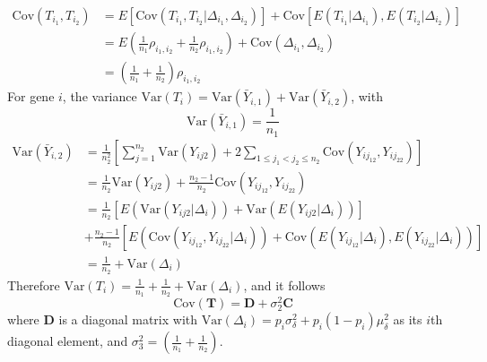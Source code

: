 \documentclass[11pt, a4paper]{article}
\begin{document}
				\begin{equation}
					\begin{aligned}
						\text{Cov}(T_{i_1}, T_{i_2}) & = E\left[\text{Cov}(T_{i_1}, T_{i_2}|\Delta_{i_1}, \Delta_{i_2}) \right]  + \text{Cov}\left[E(T_{i_1}|\Delta_{i_1}), E(T_{i_2}|\Delta_{i_2})\right] \\
						& = E\left(\frac{1}{n_1}\rho_{i_1,i_2} + \frac{1}{n_2}\rho_{i_1,i_2}\right) + \text{Cov}(\Delta_{i_1}, \Delta_{i_2})\\
						& = \left(\frac{1}{n_1} + \frac{1}{n_2}\right)\rho_{i_1,i_2}
					\end{aligned}
				\end{equation}
				For gene $i$, the variance $\text{Var}(T_i) = \text{Var}(\bar{Y}_{i, 1}) + \text{Var}(\bar{Y}_{i, 2})$, with
				\[\text{Var}(\bar{Y}_{i, 1}) = \frac{1}{n_1}\] 
				\begin{equation}
					\begin{aligned}
						\text{Var}(\bar{Y}_{i, 2}) & = \frac{1}{n_2^2}\left[\sum_{j=1}^{n_2}\text{Var}(Y_{ij2}) + 2\sum_{1\leq j_1<j_2 \leq n_2} \text{Cov}(Y_{ij_12}, Y_{ij_22})\right] \\
						& = \frac{1}{n_2}\text{Var}(Y_{ij2}) + \frac{n_2-1}{n_2} \text{Cov}(Y_{ij_12}, Y_{ij_22})\\
						& = \frac{1}{n_2}\left[E\left(\text{Var}(Y_{ij2}|\Delta_i)\right) + \text{Var}\left(E(Y_{ij2}|\Delta_i)\right)\right] \\ \text{~~~} &+\frac{n_2-1}{n_2}\left[E\left(\text{Cov}(Y_{ij_12}, Y_{ij_22}|\Delta_i)\right) + \text{Cov}\left(E(Y_{ij_12}|\Delta_i), E(Y_{ij_22}|\Delta_i)\right)\right] \\
						& = \frac{1}{n_2} + \text{Var}(\Delta_i)
					\end{aligned}
				\end{equation}
				Therefore $\text{Var}(T_i)  = \frac{1}{n_1} + \frac{1}{n_2} + \text{Var}(\Delta_i)$, and it follows 
				\begin{equation}\label{eq:tvar}
					\text{Cov}(\bm T) =  \bm D + \sigma_2^2\bm C 
				\end{equation}
				where $\bm D$ is a diagonal matrix with $\text{Var}(\Delta_i) =p_i\sigma_{\delta}^2 + p_i(1-p_i)\mu_{\delta}^2$ as its $i$th diagonal element, and $\sigma_3^2 = \left(\frac{1}{n_1} + \frac{1}{n_2}\right)$.

				
				
				
								
\newpage



	
\end{document}
